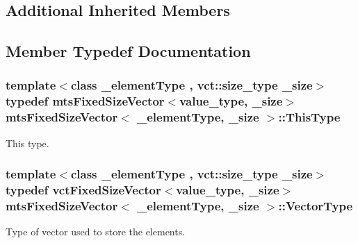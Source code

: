 \subsection*{Additional Inherited Members}


\subsection{Member Typedef Documentation}
\hypertarget{classmts_fixed_size_vector_afdc3f321836a8df42be6bed595148de7}{
\subsubsection[{This\-Type}]{\setlength{\rightskip}{0pt plus 5cm}template$<$class \-\_\-element\-Type , vct\-::size\-\_\-type \-\_\-size$>$ typedef {\bf mts\-Fixed\-Size\-Vector}$<$value\-\_\-type, \-\_\-size$>$ {\bf mts\-Fixed\-Size\-Vector}$<$ \-\_\-element\-Type, \-\_\-size $>$\-::{\bf This\-Type}}}\label{classmts_fixed_size_vector_afdc3f321836a8df42be6bed595148de7}
This type. \hypertarget{classmts_fixed_size_vector_ac5c774708b6dab6c0fe332c5fcd2c5ad}{
\subsubsection[{Vector\-Type}]{\setlength{\rightskip}{0pt plus 5cm}template$<$class \-\_\-element\-Type , vct\-::size\-\_\-type \-\_\-size$>$ typedef {\bf vct\-Fixed\-Size\-Vector}$<$value\-\_\-type, \-\_\-size$>$ {\bf mts\-Fixed\-Size\-Vector}$<$ \-\_\-element\-Type, \-\_\-size $>$\-::{\bf Vector\-Type}}}\label{classmts_fixed_size_vector_ac5c774708b6dab6c0fe332c5fcd2c5ad}
Type of vector used to store the elements. 

